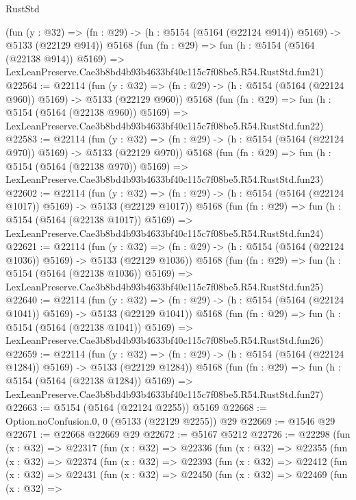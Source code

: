 \begin{lexlean}{RustStd}
\begin{coremodule}
    (fun (y : @32) => (fn : @29) -> (h : @5154 (@5164 (@22124 @914)) @5169) -> @5133 (@22129 @914))
    @5168
    (fun (fn : @29) =>
    fun (h : @5154 (@5164 (@22138 @914)) @5169) =>
    LexLeanPreserve.Cae3b8bd4b93b4633bf40c115c7f08be5.R54.RustStd.fun21)
@22564 := @22114
    (fun (y : @32) => (fn : @29) -> (h : @5154 (@5164 (@22124 @960)) @5169) -> @5133 (@22129 @960))
    @5168
    (fun (fn : @29) =>
    fun (h : @5154 (@5164 (@22138 @960)) @5169) =>
    LexLeanPreserve.Cae3b8bd4b93b4633bf40c115c7f08be5.R54.RustStd.fun22)
@22583 := @22114
    (fun (y : @32) => (fn : @29) -> (h : @5154 (@5164 (@22124 @970)) @5169) -> @5133 (@22129 @970))
    @5168
    (fun (fn : @29) =>
    fun (h : @5154 (@5164 (@22138 @970)) @5169) =>
    LexLeanPreserve.Cae3b8bd4b93b4633bf40c115c7f08be5.R54.RustStd.fun23)
@22602 := @22114
    (fun (y : @32) =>
    (fn : @29) -> (h : @5154 (@5164 (@22124 @1017)) @5169) -> @5133 (@22129 @1017))
    @5168
    (fun (fn : @29) =>
    fun (h : @5154 (@5164 (@22138 @1017)) @5169) =>
    LexLeanPreserve.Cae3b8bd4b93b4633bf40c115c7f08be5.R54.RustStd.fun24)
@22621 := @22114
    (fun (y : @32) =>
    (fn : @29) -> (h : @5154 (@5164 (@22124 @1036)) @5169) -> @5133 (@22129 @1036))
    @5168
    (fun (fn : @29) =>
    fun (h : @5154 (@5164 (@22138 @1036)) @5169) =>
    LexLeanPreserve.Cae3b8bd4b93b4633bf40c115c7f08be5.R54.RustStd.fun25)
@22640 := @22114
    (fun (y : @32) =>
    (fn : @29) -> (h : @5154 (@5164 (@22124 @1041)) @5169) -> @5133 (@22129 @1041))
    @5168
    (fun (fn : @29) =>
    fun (h : @5154 (@5164 (@22138 @1041)) @5169) =>
    LexLeanPreserve.Cae3b8bd4b93b4633bf40c115c7f08be5.R54.RustStd.fun26)
@22659 := @22114
    (fun (y : @32) =>
    (fn : @29) -> (h : @5154 (@5164 (@22124 @1284)) @5169) -> @5133 (@22129 @1284))
    @5168
    (fun (fn : @29) =>
    fun (h : @5154 (@5164 (@22138 @1284)) @5169) =>
    LexLeanPreserve.Cae3b8bd4b93b4633bf40c115c7f08be5.R54.RustStd.fun27)
@22663 := @5154 (@5164 (@22124 @2255)) @5169
@22668 := Option.noConfusion.{0, 0} (@5133 (@22129 @2255)) @29
@22669 := @1546 @29
@22671 := @22668 @22669 @29
@22672 := @5167 @5212
@22726 := @22298
    (fun (x : @32) =>
    @22317
      (fun (x : @32) =>
      @22336
        (fun (x : @32) =>
        @22355
          (fun (x : @32) =>
          @22374
            (fun (x : @32) =>
            @22393
              (fun (x : @32) =>
              @22412
                (fun (x : @32) =>
                @22431
                  (fun (x : @32) =>
                  @22450
                    (fun (x : @32) =>
                    @22469
                      (fun (x : @32) =>

\end{coremodule}
\end{lexlean}
